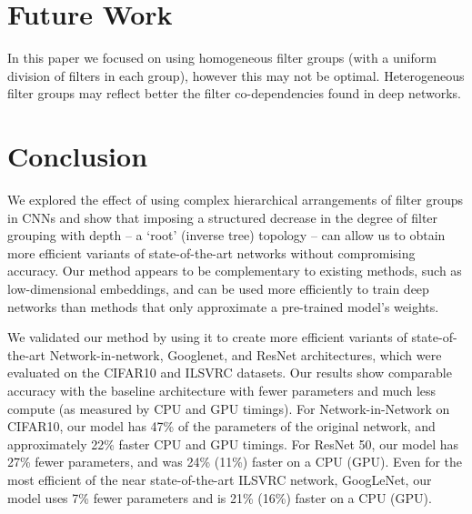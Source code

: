 \documentclass[thesis]{subfiles}
\begin{document}
	\section{Future Work} 
	In this paper we focused on using homogeneous filter groups (with a uniform division of filters in each group), however this may not be optimal. Heterogeneous filter groups may reflect better the filter co-dependencies found in deep networks. %
	
	\section{Conclusion}
	We explored the effect of using complex hierarchical arrangements of filter groups in CNNs and show that imposing a structured decrease in the degree of filter grouping with depth -- a `root' (inverse tree) topology -- can allow us to obtain more efficient variants of state-of-the-art networks without compromising accuracy. Our method appears to be complementary to existing methods, such as low-dimensional embeddings, and can be used more efficiently to train deep networks than methods that only approximate a pre-trained model's weights.
	
	We validated our method by using it to create more efficient variants of state-of-the-art Network-in-network, Googlenet, and ResNet architectures, which were evaluated on the CIFAR10 and ILSVRC datasets. Our results show comparable accuracy with the baseline architecture with fewer parameters and much less compute (as measured by CPU and GPU timings). For Network-in-Network on CIFAR10, our model has 47\% of the parameters of the original network, and approximately 22\% faster CPU and GPU timings. For ResNet 50, our model has 27\% fewer parameters, and was 24\% (11\%) faster on a CPU (GPU). 
	Even for the most efficient of the near state-of-the-art ILSVRC network, GoogLeNet, our model uses 7\% fewer parameters and is 21\% (16\%) faster on a CPU (GPU).
	
	
\end{document}
